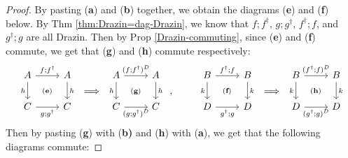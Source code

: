 \documentclass[submission,copyright,creativecommons]{eptcs}
\begin{document}
\begin{proof} By pasting (\textbf{a}) and (\textbf{b}) together, we obtain the diagrams (\textbf{e}) and (\textbf{f}) below. By Thm \ref{thm:Drazin=dag-Drazin}, we know that $f;f^\dagger$, $g;g^\dagger$, $f^\dagger;f$, and $g^\dagger;g$ are all Drazin. Then by Prop \ref{Drazin-commuting}, since (\textbf{e}) and (\textbf{f}) commute, we get that (\textbf{g}) and (\textbf{h}) commute respectively: 
\[ \begin{array}[c]{c} \begin{tikzcd}
	A & A \\
	C & C
    \arrow["{(\textbf{e})}"{description}, draw=none, from=1-1, to=2-2]
	\arrow["f;f^\dagger", from=1-1, to=1-2]
	\arrow["h"', from=1-1, to=2-1]
	\arrow["h", from=1-2, to=2-2]
	\arrow["g;g^\dagger"', from=2-1, to=2-2]
\end{tikzcd} \end{array} \Longrightarrow \begin{array}[c]{c} \begin{tikzcd}
	A & A \\
	C & C
    \arrow["{(\textbf{g})}"{description}, draw=none, from=1-1, to=2-2]
	\arrow["(f;f^\dagger)^D", from=1-1, to=1-2]
	\arrow["h"', from=1-1, to=2-1]
	\arrow["h", from=1-2, to=2-2]
	\arrow["(g;g^\dagger)^D"', from=2-1, to=2-2]
\end{tikzcd} \end{array}  ,\qquad \begin{array}[c]{c} \begin{tikzcd}
	B & B \\
	D & D
    \arrow["{(\textbf{f})}"{description}, draw=none, from=1-1, to=2-2]
	\arrow["f^\dagger;f", from=1-1, to=1-2]
	\arrow["k"', from=1-1, to=2-1]
	\arrow["k", from=1-2, to=2-2]
	\arrow["g^\dagger;g"', from=2-1, to=2-2]
\end{tikzcd} \end{array} \Longrightarrow \begin{array}[c]{c} \begin{tikzcd}
	B & B \\
	D & D
         \arrow["{(\textbf{h})}"{description}, draw=none, from=1-1, to=2-2]
	\arrow["(f^\dagger;f)^D", from=1-1, to=1-2]
	\arrow["k"', from=1-1, to=2-1]
	\arrow["k", from=1-2, to=2-2]
	\arrow["(g^\dagger;g)^D"', from=2-1, to=2-2]
\end{tikzcd} \end{array}
\]
Then by pasting (\textbf{g}) with (\textbf{b)} and (\textbf{h}) with (\textbf{a}), we get that the following diagrams commute: 

\end{proof}
\end{document}
